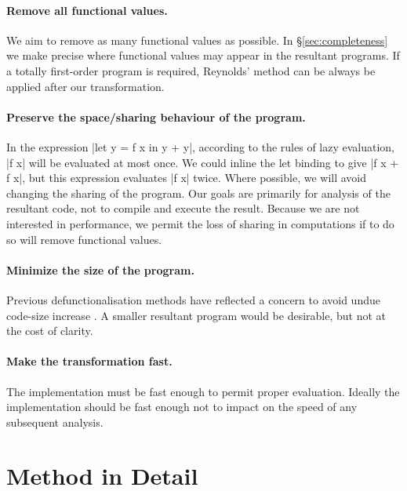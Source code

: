 \paragraph{Remove all functional values.} We aim to remove as many functional values as possible. In \S\ref{sec:completeness} we make precise where functional values may appear in the resultant programs. If a totally first-order program is required, Reynolds' method can be always be applied after our transformation.

\paragraph{Preserve the space/sharing behaviour of the program.} In the expression |let y = f x in y + y|, according to the rules of lazy evaluation, |f x| will be evaluated at most once. We could inline the let binding to give |f x + f x|, but this expression evaluates |f x| twice. Where possible, we will avoid changing the sharing of the program. Our goals are primarily for analysis of the resultant code, not to compile and execute the result. Because we are not interested in performance, we permit the loss of sharing in computations if to do so will remove functional values.

\paragraph{Minimize the size of the program.} Previous defunctionalisation methods have reflected a concern to avoid undue code-size increase \cite{chin:higher_order_removal}. A smaller resultant program would be desirable, but not at the cost of clarity.

\paragraph{Make the transformation fast.} The implementation must be fast enough to permit proper evaluation. Ideally the implementation should be fast enough not to impact on the speed of any subsequent analysis.


\section{Method in Detail}
\label{sec:detailed}

\begin{comment}
\begin{code}
data Prog = Prog deriving Eq
simplify,arity,inline,specialise :: Prog -> Prog
\end{code}
\end{comment}

